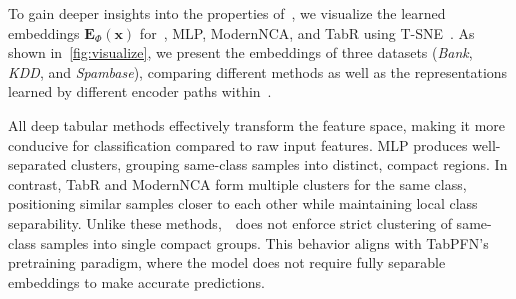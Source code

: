 To gain deeper insights into the properties of~\name, we visualize the learned embeddings \( \boldsymbol{E}_{\Phi}(\boldsymbol{x}) \) for~\name, MLP, ModernNCA, and TabR using T-SNE~\cite{van2008t-SNE}. As shown in~\autoref{fig:visualize}, we present the embeddings of three datasets (\textit{Bank}, \textit{KDD}, and \textit{Spambase}), comparing different methods as well as the representations learned by different encoder paths within~\name.  

All deep tabular methods effectively transform the feature space, making it more conducive for classification compared to raw input features. MLP produces well-separated clusters, grouping same-class samples into distinct, compact regions. In contrast, TabR and ModernNCA form multiple clusters for the same class, positioning similar samples closer to each other while maintaining local class separability. Unlike these methods,~\name~does not enforce strict clustering of same-class samples into single compact groups. This behavior aligns with TabPFN’s pretraining paradigm, where the model does not require fully separable embeddings to make accurate predictions.  

